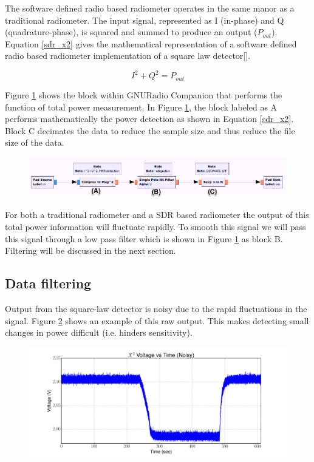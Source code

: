 The software defined radio based radiometer operates in the same manor as a traditional radiometer.  The input signal, represented as I (in-phase) and Q (quadrature-phase), is squared and summed to produce an output ($P_{out}$).  Equation \ref{sdr_x2} gives the mathematical representation of a software defined radio based radiometer implementation of a square law detector[\cite{Rashid}]. 

\begin{equation}\label{sdr_x2}
I^2+Q^2 = P_{out}
\end{equation}

Figure \ref{square_block} shows the block within GNURadio Companion that performs the function of total power measurement.  In Figure \ref{square_block}, the block labeled as A performs mathematically the power detection as shown in Equation \ref{sdr_x2}.  Block C decimates the data to reduce the sample size and thus reduce the file size of the data.  

{\begin{figure}[h!tb] 
\centering
\includegraphics[width=17cm]{Images/TPR_grc.png}
\label{square_block}
\end{figure}
}

For both a traditional radiometer and a SDR based radiometer the output of this total power information will fluctuate rapidly.  To smooth this signal we will pass this signal through a low pass filter which is shown in Figure \ref{square_block} as block B.  Filtering will be discussed in the next section.

\subsection{Data filtering}

Output from the square-law detector is noisy due to the rapid fluctuations in the signal.  Figure \ref{square_raw} shows an example of this raw output.  This makes detecting small changes in power difficult (i.e. hinders sensitivity).  

{\begin{figure}[h!tb] 
\centering
\includegraphics[width=17cm]{Experiments/Exp1/noisy_voltage.pdf}
\label{square_raw}
\end{figure}
}

